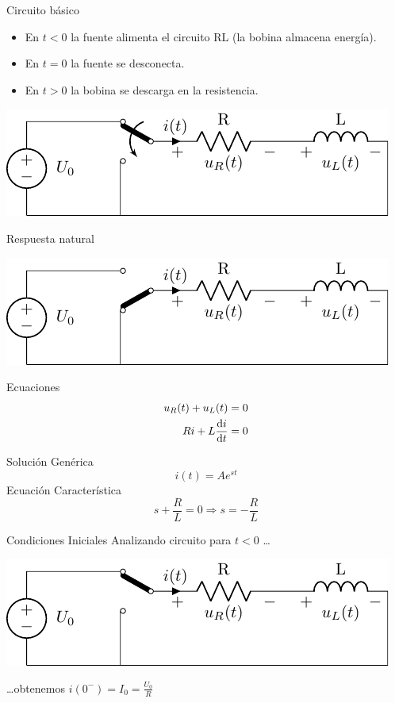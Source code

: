 \documentclass[aspectratio=169, xcolor={usenames,svgnames,dvipsnames}]{beamer}
\begin{document}
\begin{frame}[label={sec:orgc27b011}]{Circuito básico}
\begin{itemize}
\item En \(t < 0\) la fuente alimenta el circuito RL (la bobina almacena energía).
\item En \(t = 0\) la fuente se desconecta.
\item En \(t > 0\) la bobina se descarga en la resistencia.
\end{itemize}
\begin{center}
\includegraphics[width=.9\linewidth]{figs/transitorio_circuitoRL.pdf}
\end{center}
\end{frame}

\begin{frame}[label={sec:orge5dd473}]{Respuesta natural}
\begin{center}
\includegraphics[height=0.25\textheight]{figs/transitorio_circuitoRL_t0+.pdf}
\end{center}
Ecuaciones
\begin{align*}
  u_R(t) + u_L(t) &= 0\\
  R i + L\diff{i}{t} &= 0
\end{align*}

Solución Genérica
\[
  i(t) = A e^{st}
\]
Ecuación Característica
\[
  s + \frac{R}{L} = 0 \Rightarrow s = -\frac{R}{L}
\]
\end{frame}

\begin{frame}[label={sec:orgaee96d9}]{Condiciones Iniciales}
Analizando circuito para \(t < 0\) \ldots{} 
\begin{center}
\includegraphics[width=.9\linewidth]{figs/transitorio_circuitoRL_t0-.pdf}
\end{center}
\ldots{}obtenemos  \(i(0^-) = I_0 = \frac{U_0}{R}\) 
\end{frame}
\end{document}
